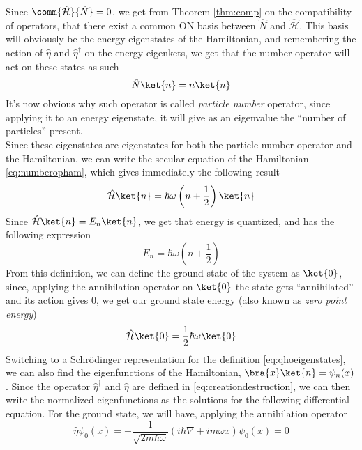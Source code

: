 \documentclass[a4paper, 11pt]{book}
\newcommand{\1}{\opr{\mathds{1}}}
\newcommand{\ham}{\mathcal{H}}
\newcommand{\opr}[1]{\hat{#1}}
\newcommand{\adj}[2][]{#2^{\dagger#1}}
\theoremstyle{plain}
\begin{document}
	Since $\comm{\opr{\ham}}{\opr{N}}=0$, we get from Theorem \ref{thm:comp} on the compatibility of operators, that there exist a common ON basis between $\opr{N}$ and $\opr{\ham}$. This basis will obviously be the energy eigenstates of the Hamiltonian, and remembering the action of $\opr{\eta}$ and $\adj{\opr{\eta}}$ on the energy eigenkets, we get that the number operator will act on these states as such
	\begin{equation}
		\opr{N}\ket{n}=n\ket{n}
		\label{eq:numberoperatoraction}
	\end{equation}
	It's now obvious why such operator is called \textit{particle number} operator, since applying it to an energy eigenstate, it will give as an eigenvalue the ``number of particles'' present.\\
	Since these eigenstates are eigenstates for both the particle number operator and the Hamiltonian, we can write the secular equation of the Hamiltonian \eqref{eq:numberopham}, which gives immediately the following result
	\begin{equation}
		\opr{\ham}\ket{n}=\hbar\omega\left( n+\frac{1}{2} \right)\ket{n}
		\label{eq:secularequation}
	\end{equation}
	Since $\opr{\ham}\ket{n}=E_n\ket{n}$, we get that energy is quantized, and has the following expression
	\begin{equation}
		E_n=\hbar\omega\left( n+\frac{1}{2} \right)
		\label{eq:energyqho}
	\end{equation}
	From this definition, we can define the ground state of the system as $\ket{0}$, since, applying the annihilation operator on $\ket{0}$ the state gets ``annihilated'' and its action gives $0$, we get our ground state energy (also known as \textit{zero point energy})
	\begin{equation}
		\opr{\ham}\ket{0}=\frac{1}{2}\hbar\omega\ket{0}
		\label{eq:qhogroundstate}
	\end{equation}
	Switching to a Schrödinger representation for the definition \eqref{eq:qhoeigenstates}, we can also find the eigenfunctions of the Hamiltonian, $\bra{x}\ket{n}=\psi_n(x)$. Since the operator $\adj{\opr{\eta}}$ and $\opr{\eta}$ are defined in \eqref{eq:creationdestruction}, we can then write the normalized eigenfunctions as the solutions for the following differential equation. For the ground state, we will have, applying the annihilation operator
	\begin{equation}
		\opr{\eta}\psi_0(x)=-\frac{1}{\sqrt{2m\hbar\omega}}\left( i\hbar\nabla+im\omega x\right)\psi_0(x)=0
		\label{eq:groundstateqho}
	\end{equation}
\end{document}
